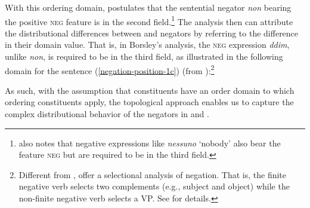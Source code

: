 \documentclass[output=paper
 	        ,biblatex
                ,babelshorthands
                ,newtxmath
                ,draftmode
                ,colorlinks, citecolor=brown
]{langscibook}
\begin{document}
\begin{exe}
\begin{xlist}
\ea
{}
\z
%
With this ordering domain, \citet{Borsley:06} postulates
that the  sentential negator \emph{non} bearing the positive \textsc{neg} feature is in the second field.\footnote{
\citet{Borsley:06} also notes that  negative expressions like \emph{nessuno} `nobody' also bear the feature \textsc{neg}
but are required to be in the third field.}
The analysis then can attribute the distributional differences between  and  negators
by referring to the difference in their domain value. That is,
in Borsley's analysis, the  \textsc{neg} expression \emph{ddim}, unlike  \emph{non},
is required to be in the third field, as illustrated in the following domain for the sentence (\ref{negation-position-1c}) (from
\citealt{Borsley:06}):\footnote{Different from \citet{Borsley:06}, \citet{BJ:00} offer  a selectional analysis of  negation.
That is, the finite negative verb selects
two complements (e.g., subject and object) while
the non-finite negative verb selects a VP. See \citet{BJ:00} for details.}

\ea
{}
\z
As such,  with the assumption that constituents have an order domain to which ordering
constituents
apply, the topological approach enables us to capture the complex distributional
behavior of the negators in  and .
%

\iffalse{
The VSO language \ili{Welsh} also employs a preverbal
negative, as illustrated by \citet{BJ:00}:

\ea
\ex \label{negation-NC-1a}
\gll Ni chaf sefyll yma \\
     \NEG{} can stand here\\
\glt `I can't stand here.'
\z
%
As given in (\ref{negation-NC-1a}), \ili{Welsh} allows the preverbal
particle \type{ni} to occur in the preverbal position.
%
With treating the negative particle to form a negative word
with the following stem, \citet{BJ:00} offer a selectional
analysis of negation.
That is, the finite negative verb selects
two complements (e.g., subject and object) while
the non-finite negative verb selects a VP.}\fi


\end{xlist}
\end{exe}
\end{document}
